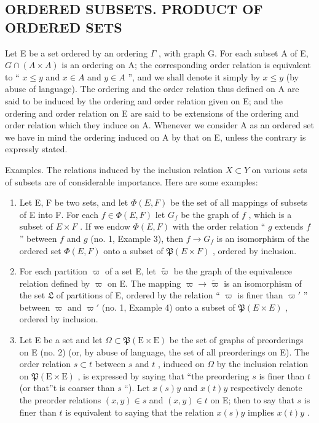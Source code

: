 \subsection{ORDERED SUBSETS. PRODUCT OF ORDERED SETS}

Let E be a set ordered by an ordering \(\Gamma\) , with graph G. For each subset A of E, \(G \cap (A \times A)\) is an ordering on A; the corresponding order relation is equivalent to `` \(x \leqslant y\) and \(x \in A\) and \(y \in A\) '', and we shall denote it simply by \(x \leqslant y\) (by abuse of language). The ordering and the order relation thus defined on A are said to be induced by the ordering and order relation given on E; and the ordering and order relation on E are said to be extensions of the ordering and order relation which they induce on A. Whenever we consider A as an ordered set we have in mind the ordering induced on A by that on E, unless the contrary is expressly stated.

Examples. The relations induced by the inclusion relation \(X \subset Y\) on various sets of subsets are of considerable importance. Here are some examples:

\begin{enumerate}
\def\labelenumi{(\arabic{enumi})}
\item
  Let E, F be two sets, and let \(\Phi(E, F)\) be the set of all mappings of subsets of E into F. For each \(f \in \Phi(E, F)\) let \(G_f\) be the graph of \(f\) , which is a subset of \(E \times F\) . If we endow \(\Phi(E, F)\) with the order relation `` \(g\) extends \(f\) '' between \(f\) and \(g\) (no. 1, Example 3), then \(f \to G_f\) is an isomorphism of the ordered set \(\Phi(E, F)\) onto a subset of \(\mathfrak{P}(E \times F)\) , ordered by inclusion.
\item
  For each partition \(\varpi\) of a set E, let \(\tilde{\varpi}\) be the graph of the equivalence relation defined by \(\varpi\) on E. The mapping \(\varpi \to \tilde{\varpi}\) is an isomorphism of the set \(\mathfrak{L}\) of partitions of E, ordered by the relation `` \(\varpi\) is finer than \(\varpi'\) '' between \(\varpi\) and \(\varpi'\) (no. 1, Example 4) onto a subset of \(\mathfrak{P}(E \times E)\) , ordered by inclusion.
\item
  Let E be a set and let \(\Omega \subset \mathfrak{P}(\mathrm{E} \times \mathrm{E})\) be the set of graphs of preorderings on E (no. 2) (or, by abuse of language, the set of all preorderings on E). The order relation \(s \subset t\) between \(s\) and \(t\) , induced on \(\Omega\) by the inclusion relation on \(\mathfrak{P}(\mathrm{E} \times \mathrm{E})\) , is expressed by saying that ``the preordering \(s\) is finer than \(t\) (or that''t is coarser than \(s\) ``). Let \(x(s)y\) and \(x(t)y\) respectively denote the preorder relations \((x,y) \in s\) and \((x,y) \in t\) on E; then to say that \(s\) is finer than \(t\) is equivalent to saying that the relation \(x(s)y\) implies \(x(t)y\) .
\end{enumerate}

